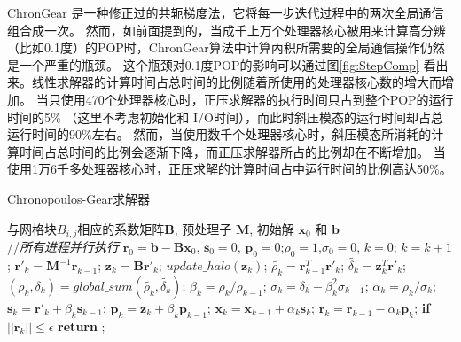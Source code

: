 ChronGear \cite{dAzevedo1999lapack} 是一种修正过的共轭梯度法，它将每一步迭代过程中的两次全局通信组合成一次。
然而，如前面提到的，当成千上万个处理器核心被用来计算高分辨（比如0.1度）的POP时，ChronGear算法中计算內积所需要的全局通信操作仍然是一个严重的瓶颈。
这个瓶颈对0.1度POP的影响可以通过图\ref{fig:StepComp} 看出来。线性求解器的计算时间占总时间的比例随着所使用的处理器核心数的增大而增加。
当只使用470个处理器核心时，正压求解器的执行时间只占到整个POP的运行时间的5\% （这里不考虑初始化和 I/O时间），而此时斜压模态的运行时间却占总运行时间的90\%左右。
然而，当使用数千个处理器核心时，斜压模态所消耗的计算时间占总时间的比例会逐渐下降，而正压求解器所占的比例却在不断增加。
当使用1万6千多处理器核心时，正压求解的计算时间占中运行时间的比例高达50\%。 

\begin{algorithm}[!t]
\caption{Chronopoulos-Gear求解器}
\label{alg:cg}
\begin{algorithmic}[1]
\REQUIRE   与网格块$B_{i,j}$相应的系数矩阵$\textbf{B}$, 预处理子 $\textbf{M}$, 初始解 $\textbf{x}_0$ 和 $\textbf{b}$  \\
//\qquad    \textit{所有进程并行执行}
\STATE $\textbf{r}_0 = \textbf{b}-\textbf{B}\textbf{x}_0$, $\textbf{s}_0 =0$, $\textbf{p}_0 =0$;\quad $\rho_0=1$,$\sigma_0=0$, $k=0$;
\STATE $k=k+1$;
\STATE $\textbf{r}'_{k} =\textbf{M}^{-1}\textbf{r}_{k-1}$; \label{pcg_scale0} 
\STATE $\textbf{z}_k = \textbf{B}\textbf{r}'_{k}$; \label{pcg_mat}
\STATE $update\_halo(\textbf{z}_{k})$;  \label{pcg_bc1}
\STATE $\tilde{\rho_k} = \textbf{r}_{k-1}^T\textbf{r}'_{k}$;\label{pcg_dot1}
\STATE $\tilde{\delta_k} = \textbf{z}_k^T\textbf{r}'_k$;\label{pcg_dot2}
\STATE $(\rho_k,\delta_k) = global\_sum(\tilde{\rho_k},\tilde{\delta_k})$;\label{pcg_global1} 
\STATE $\beta_k = \rho_k / \rho_{k-1}$;\label{pcg_beta}
\STATE $\sigma_k = \delta_k - \beta_k^2\sigma_{k-1}$;\label{pcg_sigma}
\STATE $\alpha_k = \rho_k /\sigma_{k}$;\label{pcg_alpha}
\STATE $\textbf{s}_k = \textbf{r}'_{k} +\beta_k\textbf{s}_{k-1}$;\label{pcg_scale1}
\STATE $\textbf{p}_k = \textbf{z}_{k} +\beta_k\textbf{p}_{k-1}$;\label{pcg_scale2}
\STATE $\textbf{x}_k =\textbf{x}_{k-1} +\alpha_k \textbf{s}_k$;\label{pcg_scale3}
\STATE $\textbf{r}_k =\textbf{r}_{k-1} -\alpha_k\textbf{p}_k$;\label{pcg_scale4}
\STATE \textbf{if} $||\textbf{r}_k|| \le \epsilon$  \textbf{return} ;
\ENDIF
\ENDWHILE
\end{algorithmic}
\end{algorithm}

